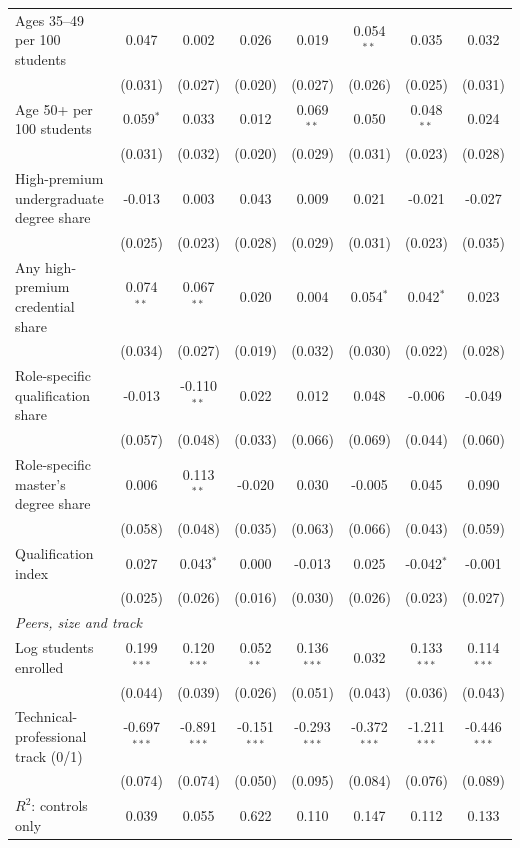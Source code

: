 \begin{table}[!htbp]
{\begin{tabular}{lccccccc}
\quad Ages 35--49 per 100 students & 0.047 & 0.002 & 0.026 & 0.019 & 0.054$^{**}$ & 0.035 & 0.032 \\
 & (0.031) & (0.027) & (0.020) & (0.027) & (0.026) & (0.025) & (0.031) \\
\quad Age 50+ per 100 students & 0.059$^{*}$ & 0.033 & 0.012 & 0.069$^{**}$ & 0.050 & 0.048$^{**}$ & 0.024 \\
 & (0.031) & (0.032) & (0.020) & (0.029) & (0.031) & (0.023) & (0.028) \\
\quad High-premium undergraduate degree share & -0.013 & 0.003 & 0.043 & 0.009 & 0.021 & -0.021 & -0.027 \\
 & (0.025) & (0.023) & (0.028) & (0.029) & (0.031) & (0.023) & (0.035) \\
\quad Any high-premium credential share & 0.074$^{**}$ & 0.067$^{**}$ & 0.020 & 0.004 & 0.054$^{*}$ & 0.042$^{*}$ & 0.023 \\
 & (0.034) & (0.027) & (0.019) & (0.032) & (0.030) & (0.022) & (0.028) \\
\quad Role-specific qualification share & -0.013 & -0.110$^{**}$ & 0.022 & 0.012 & 0.048 & -0.006 & -0.049 \\
 & (0.057) & (0.048) & (0.033) & (0.066) & (0.069) & (0.044) & (0.060) \\
\quad Role-specific master's degree share & 0.006 & 0.113$^{**}$ & -0.020 & 0.030 & -0.005 & 0.045 & 0.090 \\
 & (0.058) & (0.048) & (0.035) & (0.063) & (0.066) & (0.043) & (0.059) \\
\quad Qualification index & 0.027 & 0.043$^{*}$ & 0.000 & -0.013 & 0.025 & -0.042$^{*}$ & -0.001 \\
 & (0.025) & (0.026) & (0.016) & (0.030) & (0.026) & (0.023) & (0.027) \\
\multicolumn{8}{l}{\textit{Peers, size and track}} \\
\quad Log students enrolled & 0.199$^{***}$ & 0.120$^{***}$ & 0.052$^{**}$ & 0.136$^{***}$ & 0.032 & 0.133$^{***}$ & 0.114$^{***}$ \\
 & (0.044) & (0.039) & (0.026) & (0.051) & (0.043) & (0.036) & (0.043) \\
\quad Technical-professional track (0/1) & -0.697$^{***}$ & -0.891$^{***}$ & -0.151$^{***}$ & -0.293$^{***}$ & -0.372$^{***}$ & -1.211$^{***}$ & -0.446$^{***}$ \\
 & (0.074) & (0.074) & (0.050) & (0.095) & (0.084) & (0.076) & (0.089) \\
\midrule
$R^2$: controls only & 0.039 & 0.055 & 0.622 & 0.110 & 0.147 & 0.112 & 0.133 \\

\end{tabular}}
\end{table}
